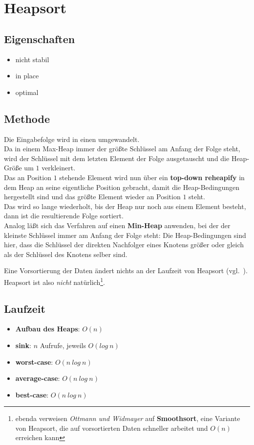 \section{Heapsort}

\subsection{Eigenschaften}
\begin{itemize}
    \item nicht stabil
    \item in place
    \item optimal
\end{itemize}

\subsection{Methode}
Die Eingabefolge wird in einen  umgewandelt.\\
Da in einem Max-Heap immer der größte Schlüssel am Anfang der Folge steht, wird der Schlüssel mit dem letzten Element der Folge ausgetauscht und die Heap-Größe um $1$ verkleinert.\\
Das an Position $1$ stehende Element wird nun über ein \textbf{top-down reheapify} in dem Heap an seine eigentliche Position gebracht, damit die Heap-Bedingungen hergestellt sind und das größte Element wieder an Position $1$ steht.\\
Das wird so lange wiederholt, bis der Heap nur noch aus einem Element besteht, dann ist die resultierende Folge sortiert.\\

\noindent
Analog läßt sich das Verfahren auf einen \textbf{Min-Heap} anwenden, bei der der kleinste Schlüssel immer am Anfang der Folge steht: Die Heap-Bedingungen sind hier, dass die Schlüssel der direkten Nachfolger eines Knotens größer oder gleich als der Schlüssel des Knotens selber sind.

\noindent
Eine Vorsortierung der Daten ändert nichts an der Laufzeit von Heapsort (vgl.~\cite[112]{OW17b}). Heapsort ist also \textit{nicht} natürlich\footnote{
ebenda verweisen \textit{Ottmann und Widmayer} auf \textbf{Smoothsort}, eine Variante von Heapsort, die auf vorsortierten Daten schneller arbeitet und $O(n)$ erreichen kann
}.

\subsection{Laufzeit}
\begin{itemize}
    \item \textbf{Aufbau des Heaps}: $O(n)$
    \item \textbf{sink}: $n$ Aufrufe, jeweils $O(log\ n)$
    \item \textbf{worst-case}: $O(n\ log\ n)$
    \item \textbf{average-case}: $O(n\ log\ n)$
    \item \textbf{best-case}: $O(n\ log\ n)$
\end{itemize}
